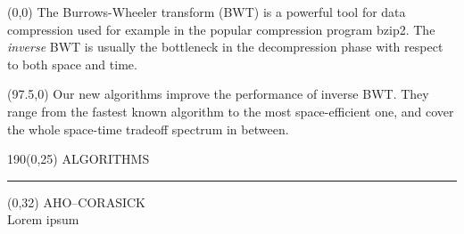 \documentclass[a4paper]{article} %
\begin{document}
\begin{textblock}{92.5}(0,0)
\sffamily
\small 
The Burrows-Wheeler transform (BWT) is a powerful tool for data
compression used for example in the popular compression program
bzip2. The \emph{inverse} BWT is usually the bottleneck in the
decompression phase with respect to both space and time.
\end{textblock}
\begin{textblock}{92.5}(97.5,0) 
  \sffamily \small 
  Our new algorithms improve the performance of inverse BWT.  They
  range from the fastest known algorithm to the most space-efficient
  one, and cover the whole space-time tradeoff spectrum in between.
\end{textblock}

\begin{textblock}{190}(0,25)
\sffamily
\Large{\color{sciorange}ALGORITHMS}\small\\
\rule[3mm]{190mm}{0.1pt}
\end{textblock} 

%

\begin{textblock}{60}(0,32)
  {\sffamily\normalsize{\color{sciorange}AHO--CORASICK
      }}\vspace{1mm}\\ %
Lorem ipsum
\end{textblock} 
\end{document}
